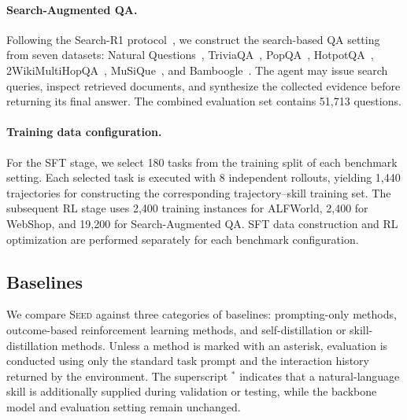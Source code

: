 \paragraph{Search-Augmented QA.}
Following the Search-R1 protocol~\citep{jin2025searchr1}, we construct the search-based QA setting from seven datasets:
Natural Questions~\citep{kwiatkowski2019natural},
TriviaQA~\citep{joshi2017triviaqa},
PopQA~\citep{mallen2023popqa},
HotpotQA~\citep{yang2018hotpotqa},
2WikiMultiHopQA~\citep{ho2020constructing},
MuSiQue~\citep{trivedi2022musique}, and
Bamboogle~\citep{press2023measuring}.
The agent may issue search queries, inspect retrieved documents, and synthesize the collected evidence before returning its final answer.
The combined evaluation set contains 51,713 questions.

\paragraph{Training data configuration.}
For the SFT stage, we select 180 tasks from the training split of each benchmark setting.
Each selected task is executed with 8 independent rollouts, yielding 1,440 trajectories for constructing the corresponding trajectory--skill training set.
The subsequent RL stage uses 2,400 training instances for ALFWorld, 2,400 for WebShop, and 19,200 for Search-Augmented QA.
SFT data construction and RL optimization are performed separately for each benchmark configuration.

\subsection{Baselines}
\label{app:baselines}

We compare \textsc{Seed} against three categories of baselines: prompting-only methods, outcome-based reinforcement learning methods, and self-distillation or skill-distillation methods.
Unless a method is marked with an asterisk, evaluation is conducted using only the standard task prompt and the interaction history returned by the environment.
The superscript $^{*}$ indicates that a natural-language skill is additionally supplied during validation or testing, while the backbone model and evaluation setting remain unchanged.

